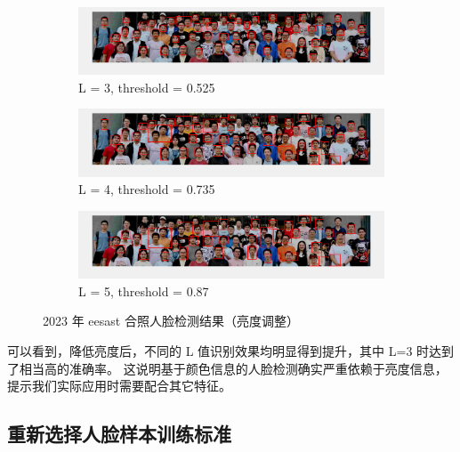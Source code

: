 \documentclass[a4paper]{article}  %
\begin{document}
\begin{figure}[ht]
    \centering
    \begin{subfigure}[b]{1.0\textwidth}
        \centering
        \includegraphics[width=\textwidth]{asserts/4_4_eesast_L3.png}
        \caption{
            L = 3, threshold = 0.525
        }\label{fig:4_4_eesast_L3}
    \end{subfigure}
    \vfill
    \begin{subfigure}[b]{1.0\textwidth}
        \centering
        \includegraphics[width=\textwidth]{asserts/4_4_eesast_L4.png}
        \caption{
            L = 4, threshold = 0.735
        }\label{fig:4_4_eesast_L4}
    \end{subfigure}
    \vfill
    \begin{subfigure}[b]{1.0\textwidth}
        \centering
        \includegraphics[width=\textwidth]{asserts/4_4_eesast_L5.png}
        \caption{
            L = 5, threshold = 0.87
        }\label{fig:4_4_eesast_L5}
    \end{subfigure}
    \caption{
        2023 年 eesast 合照人脸检测结果（亮度调整）
    }\label{fig:4_4_eesast}
\end{figure}

可以看到，降低亮度后，不同的 L 值识别效果均明显得到提升，其中 L=3 时达到了相当高的准确率。
这说明基于颜色信息的人脸检测确实严重依赖于亮度信息，提示我们实际应用时需要配合其它特征。

\subsection{重新选择人脸样本训练标准}
\end{document}
